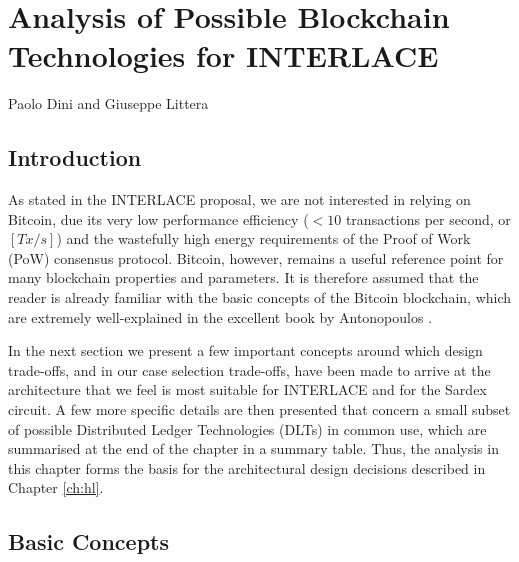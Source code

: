 \chapter{Analysis of Possible Blockchain Technologies for INTERLACE}
\label{ch:dlt}

\vspace{-1cm}
\begin{center}
Paolo Dini and Giuseppe Littera
\end{center}

\section{Introduction}
As stated in the INTERLACE proposal, we are not interested in relying on Bitcoin, due its very low performance efficiency ($< 10$ transactions per second, or $[Tx/s]$) and the wastefully high energy requirements of the Proof of Work (PoW) consensus protocol. Bitcoin, however, remains a useful reference point for many blockchain properties and parameters. It is therefore assumed that the reader is already familiar with the basic concepts of the Bitcoin blockchain, which are extremely well-explained in the excellent book by Antonopoulos \cite{Antonopoulos2015}.

In the next section we present a few important concepts around which design trade-offs, and in our case selection trade-offs, have been made to arrive at the architecture that we feel is most suitable for INTERLACE and for the Sardex circuit. A few more specific details are then presented that concern a small subset of possible Distributed Ledger Technologies (DLTs) in common use, which are summarised at the end of the chapter in a summary table. Thus, the analysis in this chapter forms the basis for the architectural design decisions described in Chapter \ref{ch:hl}.

\section{Basic Concepts}
